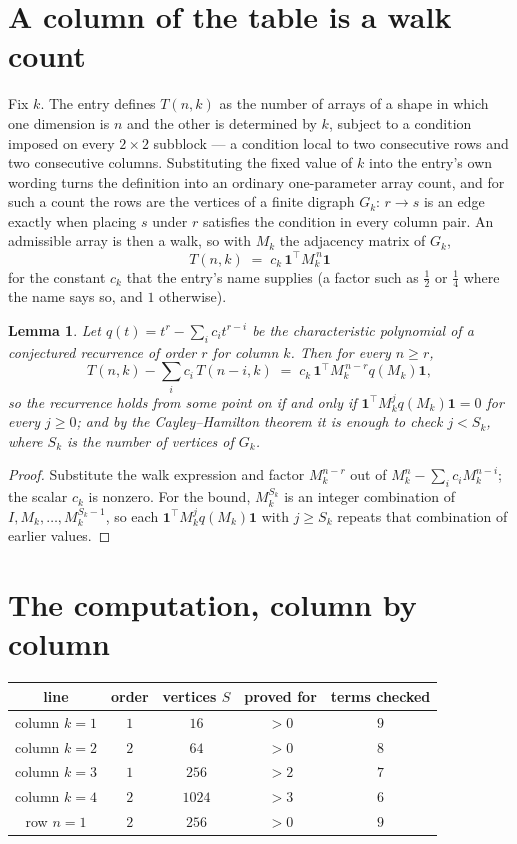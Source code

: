 \documentclass[11pt,a4paper]{article}
\theoremstyle{plain}
\newtheorem{lemma}[theorem]{Lemma}
\theoremstyle{definition}
\begin{document}
\section{A column of the table is a walk count}

Fix $k$. The entry defines $T(n,k)$ as the number of arrays of a shape in which one dimension
is $n$ and the other is determined by $k$, subject to a condition imposed on every
$2\times2$ subblock --- a condition local to two consecutive rows and two consecutive columns.
Substituting the fixed value of $k$ into the entry's own wording turns the definition into an
ordinary one-parameter array count, and for such a count the rows are the vertices of a finite
digraph $G_k$: $r\to s$ is an edge exactly when placing $s$ under $r$ satisfies the condition
in every column pair. An admissible array is then a walk, so with $M_k$ the adjacency matrix
of $G_k$,
\[
T(n,k)\;=\;c_k\,\mathbf{1}^{\!\top}M_k^{\,n}\mathbf{1}
\]
for the constant $c_k$ that the entry's name supplies (a factor such as $\tfrac12$ or
$\tfrac14$ where the name says so, and $1$ otherwise).

\begin{lemma}\label{lem:crit}
Let $q(t)=t^{r}-\sum_i c_it^{r-i}$ be the characteristic polynomial of a conjectured
recurrence of order $r$ for column $k$. Then for every $n\ge r$,
\[
T(n,k)-\sum_i c_i\,T(n-i,k)\;=\;c_k\,\mathbf{1}^{\!\top}M_k^{\,n-r}q(M_k)\mathbf{1},
\]
so the recurrence holds from some point on if and only if
$\mathbf{1}^{\!\top}M_k^{j}q(M_k)\mathbf{1}=0$ for every $j\ge0$; and by the
Cayley--Hamilton theorem it is enough to check $j<S_k$, where $S_k$ is the number of vertices
of $G_k$.
\end{lemma}

\begin{proof}
Substitute the walk expression and factor $M_k^{n-r}$ out of $M_k^{n}-\sum_ic_iM_k^{n-i}$;
the scalar $c_k$ is nonzero. For the bound, $M_k^{S_k}$ is an integer combination of
$I,M_k,\dots,M_k^{S_k-1}$, so each $\mathbf{1}^{\!\top}M_k^{j}q(M_k)\mathbf{1}$ with
$j\ge S_k$ repeats that combination of earlier values.
\end{proof}

\section{The computation, column by column}

\begin{center}
\begin{tabular}{ccccc}
line & order & vertices $S$ & proved for & terms checked \\ \hline
column $k$$=1$ & $1$ & $16$ & $>0$ & $9$ \\
column $k$$=2$ & $2$ & $64$ & $>0$ & $8$ \\
column $k$$=3$ & $1$ & $256$ & $>2$ & $7$ \\
column $k$$=4$ & $2$ & $1024$ & $>3$ & $6$ \\
row $n$$=1$ & $2$ & $256$ & $>0$ & $9$ \\
\end{tabular}
\end{center}
\end{document}
